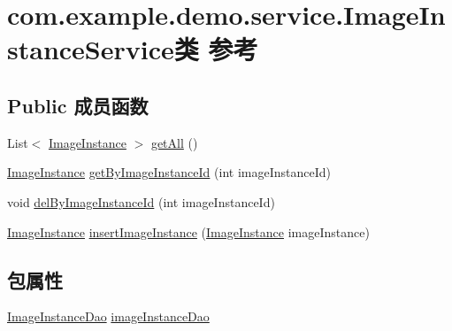 \hypertarget{classcom_1_1example_1_1demo_1_1service_1_1_image_instance_service}{}\section{com.\+example.\+demo.\+service.\+Image\+Instance\+Service类 参考}
\label{classcom_1_1example_1_1demo_1_1service_1_1_image_instance_service}
\subsection*{Public 成员函数}
\begin{DoxyCompactItemize}
\item 
List$<$ \mbox{\hyperlink{classcom_1_1example_1_1demo_1_1modular_1_1_image_instance}{Image\+Instance}} $>$ \mbox{\hyperlink{classcom_1_1example_1_1demo_1_1service_1_1_image_instance_service_ade3d090f8feae6d1fa366cbb44594154}{get\+All}} ()
\item 
\mbox{\hyperlink{classcom_1_1example_1_1demo_1_1modular_1_1_image_instance}{Image\+Instance}} \mbox{\hyperlink{classcom_1_1example_1_1demo_1_1service_1_1_image_instance_service_a054df3b2eaf939b0d7a2fd29ac79884f}{get\+By\+Image\+Instance\+Id}} (int image\+Instance\+Id)
\item 
void \mbox{\hyperlink{classcom_1_1example_1_1demo_1_1service_1_1_image_instance_service_a3235284ac28c76c7e607366dbd3eb7ae}{del\+By\+Image\+Instance\+Id}} (int image\+Instance\+Id)
\item 
\mbox{\hyperlink{classcom_1_1example_1_1demo_1_1modular_1_1_image_instance}{Image\+Instance}} \mbox{\hyperlink{classcom_1_1example_1_1demo_1_1service_1_1_image_instance_service_a960420a9cf2e4a91a3f91e481300f8e1}{insert\+Image\+Instance}} (\mbox{\hyperlink{classcom_1_1example_1_1demo_1_1modular_1_1_image_instance}{Image\+Instance}} image\+Instance)
\end{DoxyCompactItemize}
\subsection*{包属性}
\begin{DoxyCompactItemize}
\item 
\mbox{\hyperlink{interfacecom_1_1example_1_1demo_1_1dao_1_1_image_instance_dao}{Image\+Instance\+Dao}} \mbox{\hyperlink{classcom_1_1example_1_1demo_1_1service_1_1_image_instance_service_a38c79a8ca34e361f88789f1e2b03611b}{image\+Instance\+Dao}}
\end{DoxyCompactItemize}


